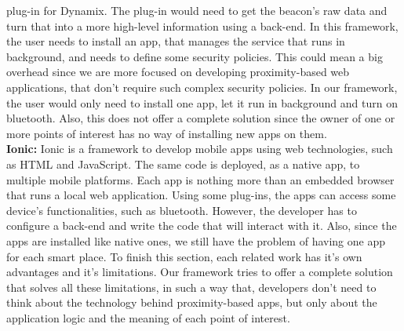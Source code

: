 plug-in for Dynamix. The plug-in would
need to get the beacon's raw data and
turn that into a more high-level information 
using a back-end. In this framework,
the user needs to install an app, that manages the service
that runs in background, and needs to define some
security policies. This could mean a big overhead since
we are more focused on developing proximity-based
web applications, that don't require such complex security
policies. In our framework, the user would only need to
install one app, let it run in background and turn on
bluetooth. Also, this does not offer a complete solution
since the owner of one or more points of interest
has no way of installing new apps on them. \\
\textbf{Ionic:} Ionic is a framework to develop mobile apps
using web technologies, such as HTML and JavaScript. The
same code is deployed, as a native app, to multiple mobile
platforms. Each app is nothing more than an embedded browser
that runs a local web application. 
Using some plug-ins, the apps can access some
device's functionalities, such as bluetooth. However,
the developer has to configure a back-end and write the
code that will interact with it. Also, since the apps are
installed like native ones, we still have the problem of
having one app for each smart place.
To finish this section, each related work has it's own
advantages and it's limitations. Our framework tries 
to offer a complete solution that solves all
these limitations, in such a way that, developers don't
need to think about the technology behind proximity-based
apps, but only about the application logic and the meaning
of each point of interest.
